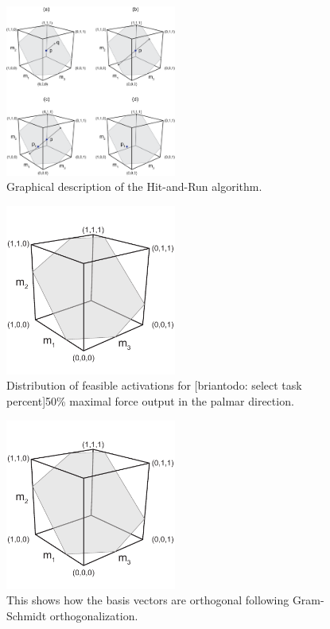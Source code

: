 \begin{figure}[htbp]
\centering
\includegraphics[width=0.5\textwidth]{sections/figs/hitruncube.png}
\caption{Graphical description of the Hit-and-Run algorithm.}
\label{fig:hitruncube}
\end{figure}

\begin{figure}[htbp]
\centering
\includegraphics[width=0.5\textwidth,page=7]{sections/figs/HitandRunSchematics_all.pdf}
\caption{Distribution of feasible activations for [briantodo: select task percent]50\% maximal force output in the palmar direction.}
\label{fig:prebasis_cube}
\end{figure}

\begin{figure}[htbp]
\centering
\includegraphics[width=0.5\textwidth,page=8]{sections/figs/HitandRunSchematics_all.pdf}
\caption{This shows how the basis vectors are orthogonal following Gram-Schmidt orthogonalization.}
\label{fig:postbasis_cube}
\end{figure}

